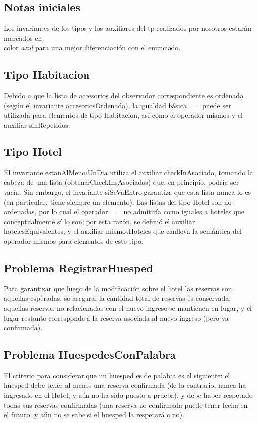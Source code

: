 \subsection{Notas iniciales}
Los invariantes de los tipos y los auxiliares del tp realizados por nosotros estar\'an marcados en\\
   color \textcolor{\ColorColoredCommands}{\emph{azul}} para una mejor diferenciaci\'on con el enunciado.

\subsection{Tipo Habitacion}
Debido a que la lista de accesorios del observador correspondiente es ordenada (seg\'un el invariante accesoriosOrdenada), la igualdad b\'asica == puede ser utilizada para elementos de tipo Habitacion, as\'i como el operador mismos y el auxiliar sinRepetidos.

\subsection{Tipo Hotel}   
El invariante estanAlMenosUnDia utiliza el auxiliar checkInAsociado, tomando la cabeza de una lista (obtenerCheckInsAsociados) que, en principio, podr\'ia ser vac\'ia. Sin embargo, el invariante siSeVaEntro garantiza que esta lista nunca lo es (en particular, tiene siempre un elemento).
Las listas del tipo Hotel son no ordenadas, por lo cual el operador == no admitir\'ia como iguales a hoteles que conceptualmente s\'i lo son; por esta raz\'on, se defini\'o el auxiliar hotelesEquivalentes, y el auxiliar mismosHoteles que conlleva la sem\'antica del operador mismos para elementos de este tipo.

\subsection{Problema RegistrarHuesped}
Para garantizar que luego de la modificaci\'on sobre el hotel las reservas son aquellas esperadas, se asegura: la cantidad total de reservas es conservada, aquellas reservas no relacionadas con el nuevo ingreso se mantienen en lugar, y el lugar restante corresponde a la reserva asociada al nuevo ingreso (pero ya confirmada).

\subsection{Problema HuespedesConPalabra}
El criterio para considerar que un huesped es de palabra es el siguiente: el huesped debe tener al menos una reserva confirmada (de lo contrario, nunca ha ingresado en el Hotel, y a\'un no ha sido puesto a prueba), y debe haber respetado todas sus reservas confirmadas (una reserva no confirmada puede tener fecha en el futuro, y a\'un no se sabe si el huesped la respetar\'a o no).